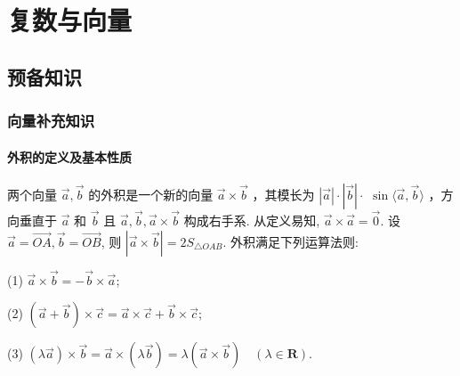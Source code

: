 \chapter{复数与向量}
\section{预备知识}
\subsection{向量补充知识}
\subsubsection{外积的定义及基本性质}
两个向量 $\vec{a} , \vec{b}$ 的外积是一个新的向量 $\vec{a} \times \vec{b}$ ，其模长为 $|\vec{a}| \cdot|\vec{b}| \cdot$ $\sin \langle\vec{a}, \vec{b}\rangle$ ，方向垂直于 $\vec{a}$ 和 $\vec{b}$ 且 $\vec{a} , \vec{b} , \vec{a} \times \vec{b}$ 构成右手系.
从定义易知, $\vec{a} \times \vec{a}=\overrightarrow{0}$. 设 $\vec{a}=\overrightarrow{O A}, \vec{b}=\overrightarrow{O B}$, 则 $|\vec{a} \times \vec{b}|=2 S_{\triangle O A B}$.
外积满足下列运算法则:

(1) $\vec{a} \times \vec{b}=-\vec{b} \times \vec{a}$;

(2) $(\vec{a}+\vec{b}) \times \vec{c}=\vec{a} \times \vec{c}+\vec{b} \times \vec{c}$;

(3) $(\lambda \vec{a}) \times \vec{b}=\vec{a} \times(\lambda \vec{b})=\lambda(\vec{a} \times \vec{b}) \quad(\lambda \in \mathbf{R})$.

